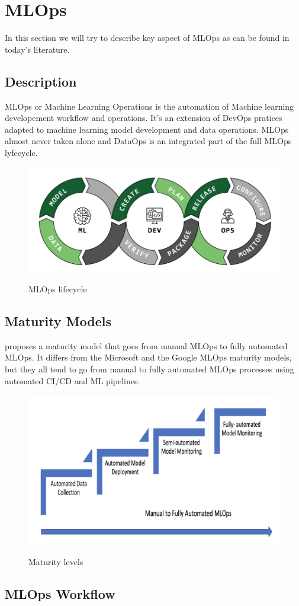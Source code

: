 \section{MLOps}\label{sec:mlops}

In this section we will try to describe key aspect of MLOps as can be found in today's literature.

\subsection{Description}
MLOps or Machine Learning Operations is the automation of Machine learning developement workflow and operations.
It's an extension of DevOps pratices adapted to machine learning model development and data operations.
MLOps almost never taken alone and DataOps is an integrated part of the full MLOps lyfecycle.

\begin{figure}[!htbp]
    \caption{MLOps lifecycle\cite{mlops-definition-tools-and-challenge}}
    \centering
    \includegraphics[scale=0.5]{images/ml-dev-ops.png}
    \label{fig:ml-dev-ops}
\end{figure}

\subsection{Maturity Models}
\cite{mlops-maturity-model} proposes a maturity model that goes from manual MLOps to fully automated MLOps.
It differs from the Microsoft and the Google MLOps maturity models,
but they all tend to go from manual to fully automated MLOps processes using automated CI/CD and
ML pipelines.\cite{mlops-definition-tools-and-challenge}

\begin{figure}[!htbp]
    \caption{Maturity levels \cite{mlops-maturity-model}}
    \centering
    \includegraphics[scale=0.5]{images/maturity-levels.png}
    \label{fig:maturity}
\end{figure}

\subsection{MLOps Workflow}